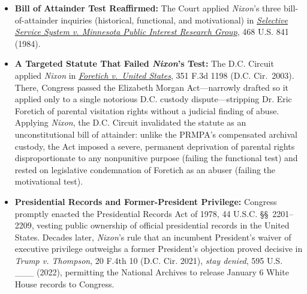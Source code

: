 \documentclass[12pt]{article}
\begin{document}
\begin{itemize}

\item \textbf{Bill of Attainder Test Reaffirmed:} The Court applied \textit{Nixon}'s three bill-of-attainder inquiries (historical, functional, and motivational) in \href{https://supreme.justia.com/cases/federal/us/468/841/}{\textit{Selective Service System v. Minnesota Public Interest Research Group}}, 468 U.S. 841 (1984).

\item \textbf{A Targeted Statute That Failed \textit{Nixon}'s Test:} The D.C. Circuit applied \textit{Nixon} in \href{https://law.justia.com/cases/federal/appellate-courts/F3/351/1198/525998/}{\textit{Foretich v.\ United States}}, 351 F.3d 1198 (D.C. Cir.\ 2003). There, Congress passed the Elizabeth Morgan Act---narrowly drafted so it applied only to a single notorious D.C. custody dispute---stripping Dr. Eric Foretich of parental visitation rights without a judicial finding of abuse. Applying \textit{Nixon}, the D.C. Circuit invalidated the statute as an unconstitutional bill of attainder: unlike the PRMPA's compensated archival custody, the Act imposed a severe, permanent deprivation of parental rights disproportionate to any nonpunitive purpose (failing the functional test) and rested on legislative condemnation of Foretich as an abuser (failing the motivational test).

\item \textbf{Presidential Records and Former-President Privilege:} Congress promptly enacted the Presidential Records Act of 1978, 44 U.S.C. \S\S~2201--2209, vesting public ownership of official presidential records in the United States. Decades later, \textit{Nixon}'s rule that an incumbent President's waiver of executive privilege outweighs a former President's objection proved decisive in \textit{Trump v. Thompson}, 20 F.4th 10 (D.C. Cir. 2021), \textit{stay denied}, 595 U.S. \_\_\_ (2022), permitting the National Archives to release January 6 White House records to Congress.

\end{itemize}
\end{document}
